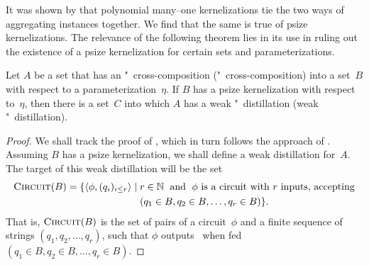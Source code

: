 It was shown by \textcite{bodlaender2009problems,bodlaender2014kernelization} that polynomial many--one kernelizations tie the two ways of aggregating instances together.
We find that the same is true of psize kernelizations.
The relevance of the following theorem lies in its use in ruling out the existence of a psize kernelization for certain sets and parameterizations.
\begin{theorem}
\label{thm:distillation}%
  Let $A$ be a set that has an "~cross-composition ("~cross-composition) into a set~$B$ with respect to a parameterization~$\eta$.
  If $B$ has a psize kernelization with respect to~$\eta$, then there is a set~$C$ into which $A$ has a weak "~distillation (weak "~distillation).
\end{theorem}
\begin{proof}
  We shall track the proof of \textcite[Theorem~3.4]{bodlaender2014kernelization}, which in turn follows the approach of \textcite[Lemma~2]{bodlaender2009problems}.
  Assuming $B$ has a psize kernelization, we shall define a weak distillation for~$A$.
  The target of this weak distillation will be the set
  \begin{align*}
    \textnormal{\textsc{Circuit}}(B) = \{{\langle \phi, (q_i)_{i \le r}\rangle} \;|\; &r \in \mathbb{N} \;\text{ and }\; \text{$\phi$ is a circuit with $r$ inputs, accepting} \\
      &(q_1 \in B, q_2 \in B, \ldots, q_r \in B)\}.
  \end{align*}
  That is, $\textnormal{\textsc{Circuit}}(B)$ is the set of pairs of a circuit~$\phi$ and a finite sequence of strings $(q_1, q_2, \ldots, q_r)$, such that $\phi$ outputs~ when fed $(q_1 \in B, q_2 \in B, \ldots, q_r \in B)$.


\end{proof}
